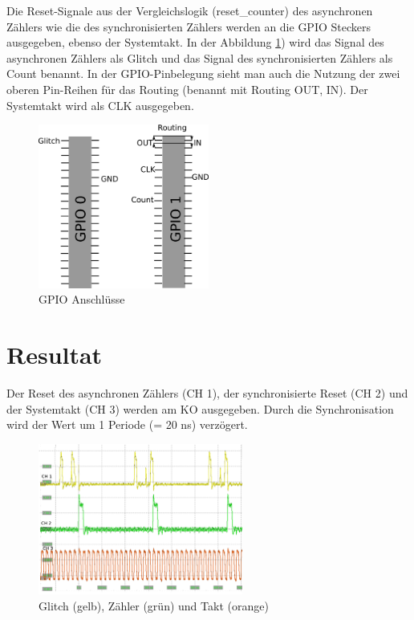 Die Reset-Signale aus der Vergleichslogik (reset\_counter) des asynchronen Zählers wie die des synchronisierten Zählers werden an die GPIO Steckers ausgegeben, ebenso der Systemtakt. In der Abbildung \ref{fig.glitch.GPIO}) wird das Signal des asynchronen Zählers als Glitch und das Signal des synchronisierten Zählers als Count benannt. In der GPIO-Pinbelegung sieht man auch die Nutzung der zwei oberen Pin-Reihen für das Routing (benannt mit Routing OUT, IN). Der Systemtakt wird als CLK ausgegeben.
\begin{figure}[H]
	\includegraphics[width=0.5\textwidth]{images/glitch/GPIO_Belegung.png}
	\caption{GPIO Anschlüsse}
	\label{fig.glitch.GPIO}
\end{figure}


\newpage
\section{Resultat }\label{sect.glitch_resultat}

Der Reset des asynchronen Zählers (CH 1), der synchronisierte Reset (CH 2) und der Systemtakt (CH 3) werden am KO ausgegeben. Durch die Synchronisation wird der Wert um 1 Periode (= 20 ns) verzögert.

\begin{figure}[H]
	\includegraphics[width=0.6\textwidth]{images/glitch/Glitch_2_good.png}
	\caption{Glitch (gelb), Zähler (grün) und Takt (orange)}
	\label{fig.glitch.result_1}
\end{figure}

